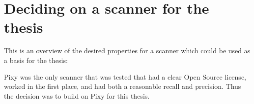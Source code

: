 \section{Deciding on a scanner for the thesis}

This is an overview of the desired properties for a scanner which could be used as a basis for the thesis:


Pixy was the only scanner that was tested that had a clear Open Source license, worked in the first place, and had both a reasonable recall and precision. Thus the decision was to build on Pixy for this thesis.
